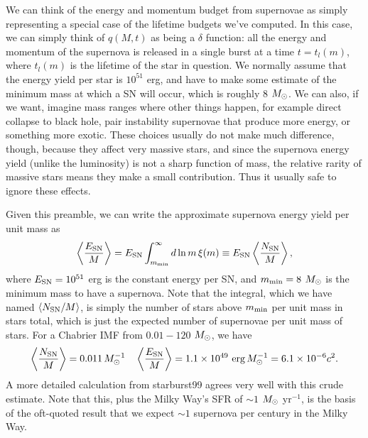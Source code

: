 We can think of the energy and momentum budget from supernovae as simply representing a special case of the lifetime budgets we've computed. In this case, we can simply think of $q(M,t)$ as being a $\delta$ function: all the energy and momentum of the supernova is released in a single burst at a time $t=t_l(m)$, where $t_l(m)$ is the lifetime of the star in question. We normally assume that the energy yield per star is $10^{51}$ erg, and have to make some estimate of the minimum mass at which a SN will occur, which is roughly 8 $M_{\odot}$. We can also, if we want, imagine mass ranges where other things happen, for example direct collapse to black hole, pair instability supernovae that produce more energy, or something more exotic. These choices usually do not make much difference, though, because they affect very massive stars, and since the supernova energy yield (unlike the luminosity) is not a sharp function of mass, the relative rarity of massive stars means they make a small contribution. Thus it usually safe to ignore these effects.

Given this preamble, we can write the approximate supernova energy yield per unit mass as
\begin{equation}
\left\langle \frac{E_{\rm SN}}{M}\right\rangle = E_{\rm SN} \int_{m_{\rm min}}^\infty d\ln m\, \xi(m) \equiv E_{\rm SN} \left\langle \frac{N_{\rm SN}}{M}\right\rangle,
\end{equation}
where $E_{\rm SN} = 10^{51}$ erg is the constant energy per SN, and $m_{\rm min} = 8$ $M_{\odot}$ is the minimum mass to have a supernova. Note that the integral, which we have named $\langle N_{\rm SN}/M\rangle$, is simply the number of stars above $m_{\rm min}$ per unit mass in stars total, which is just the expected number of supernovae per unit mass of stars. For a Chabrier IMF from $0.01-120$ $M_{\odot}$, we have
\begin{equation}
\left\langle \frac{N_{\rm SN}}{M}\right\rangle = 0.011\, M_{\odot}^{-1}
\quad
\left\langle \frac{E_{\rm SN}}{M}\right\rangle = 1.1\times 10^{49}\mbox{ erg}\,M_{\odot}^{-1}=6.1\times 10^{-6} c^2.
\end{equation}
A more detailed calculation from starburst99 agrees very well with this crude estimate. Note that this, plus the Milky Way's SFR of $\sim 1$ $M_{\odot}$ yr$^{-1}$, is the basis of the oft-quoted result that we expect $\sim 1$ supernova per century in the Milky Way.

